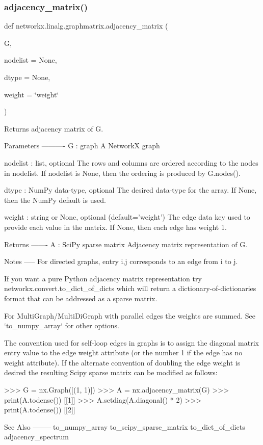 \subsubsection{\texorpdfstring{adjacency\+\_\+matrix()}{adjacency\_matrix()}}
{\footnotesize\ttfamily def networkx.\+linalg.\+graphmatrix.\+adjacency\+\_\+matrix (\begin{DoxyParamCaption}\item[{}]{G,  }\item[{}]{nodelist = {\ttfamily None},  }\item[{}]{dtype = {\ttfamily None},  }\item[{}]{weight = {\ttfamily \char`\"{}weight\char`\"{}} }\end{DoxyParamCaption})}

\begin{DoxyVerb}Returns adjacency matrix of G.

Parameters
----------
G : graph
   A NetworkX graph

nodelist : list, optional
   The rows and columns are ordered according to the nodes in nodelist.
   If nodelist is None, then the ordering is produced by G.nodes().

dtype : NumPy data-type, optional
    The desired data-type for the array.
    If None, then the NumPy default is used.

weight : string or None, optional (default='weight')
   The edge data key used to provide each value in the matrix.
   If None, then each edge has weight 1.

Returns
-------
A : SciPy sparse matrix
  Adjacency matrix representation of G.

Notes
-----
For directed graphs, entry i,j corresponds to an edge from i to j.

If you want a pure Python adjacency matrix representation try
networkx.convert.to_dict_of_dicts which will return a
dictionary-of-dictionaries format that can be addressed as a
sparse matrix.

For MultiGraph/MultiDiGraph with parallel edges the weights are summed.
See `to_numpy_array` for other options.

The convention used for self-loop edges in graphs is to assign the
diagonal matrix entry value to the edge weight attribute
(or the number 1 if the edge has no weight attribute).  If the
alternate convention of doubling the edge weight is desired the
resulting Scipy sparse matrix can be modified as follows:

>>> G = nx.Graph([(1, 1)])
>>> A = nx.adjacency_matrix(G)
>>> print(A.todense())
[[1]]
>>> A.setdiag(A.diagonal() * 2)
>>> print(A.todense())
[[2]]

See Also
--------
to_numpy_array
to_scipy_sparse_matrix
to_dict_of_dicts
adjacency_spectrum
\end{DoxyVerb}
 \mbox{\label{namespacenetworkx_1_1linalg_1_1graphmatrix_adaf5556e243da34e5fba7abf1886ee7f}} 

